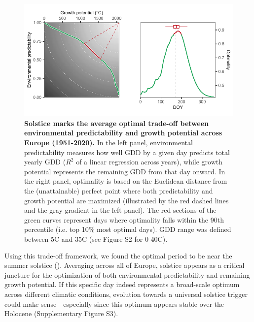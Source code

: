 \documentclass[11pt,letter]{article}
\begin{document}
\begin{figure}[h]
\centering
\includegraphics{global_optimality.pdf}
\vspace*{-0.5cm}
\caption{\textbf{Solstice marks the average optimal trade-off between environmental predictability and growth potential across Europe (1951-2020).} In the left panel, environmental predictability measures how well GDD by a given day predicts total yearly GDD ($R^2$ of a linear regression across years), while growth potential represents the remaining GDD from that day onward. In the right panel, optimality is based on the Euclidean distance from the (unattainable) perfect point where both predictability and growth potential are maximized (illustrated by the red dashed lines and the gray gradient in the left panel). The red sections of the green curves represent days where optimality falls within the 90th percentile (i.e. top 10\% most optimal days). GDD range was defined between 5\degree C and 35\degree C (see Figure S2 for 0-40\degree C).} 
\label{fig:globaloptimality}
\end{figure}

Using this trade-off framework, we found the optimal period to be near the summer solstice (). Averaging across all of Europe, solstice appears as a critical juncture for the optimization of both environmental predictability and remaining growth potential.
If this specific day indeed represents a broad-scale optimum across different climatic conditions, evolution towards a universal solstice trigger could make sense---especially since this optimum appears stable over the Holocene (Supplementary Figure S3). 
\end{document}
